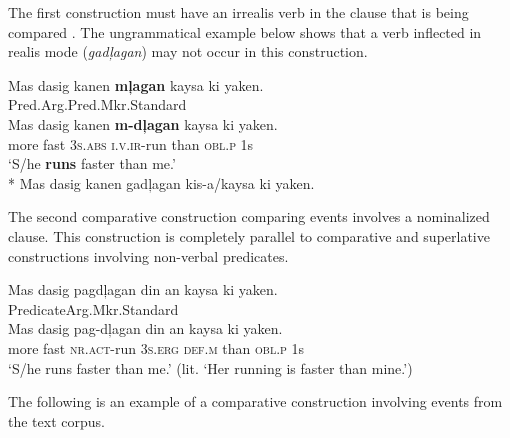 The first construction must have an irrealis verb in the clause that is being compared . The ungrammatical example below shows that a verb inflected in realis mode (\textit{gadļagan}) may not occur in this construction.

\ea
\label{ex:fasterthanme}
Mas  dasig  kanen  \textbf{mļagan}  kaysa  ki  yaken. \\\smallskip
Pred.\hspace{1cm}Arg.\hspace{.4cm}Pred.\hspace{.9cm}Mkr.\hspace{.3cm}Standard \\
\gll Mas  dasig  kanen  \textbf{m-dļagan}  kaysa  ki  yaken. \\
more  fast  3\textsc{s.abs}  \textsc{i.v.ir}-run  than  \textsc{obl.p}  1s \\
\glt ‘S/he \textbf{runs} faster than me.’ \\\smallskip
* Mas dasig kanen gadļagan kis-a/kaysa ki yaken.
\z

The second comparative construction comparing events involves a nominalized clause. This construction is completely parallel to comparative and superlative constructions involving non-verbal predicates.

\ea
Mas  dasig  pagdļagan  din  an  kaysa  ki  yaken. \\\smallskip
Predicate\hspace{.4cm}Arg.\hspace{3.3cm}Mkr.\hspace{.2cm}Standard \\
\gll Mas  dasig  pag-dļagan  din  an  kaysa  ki  yaken. \\
more  fast  \textsc{nr.act}-run  3\textsc{s.erg}  \textsc{def.m}  than  \textsc{obl.p}  1s \\
\glt ‘S/he runs faster than me.’ (lit. ‘Her running is faster than mine.’)
\z

The following is an example of a comparative construction involving events from the text corpus.

